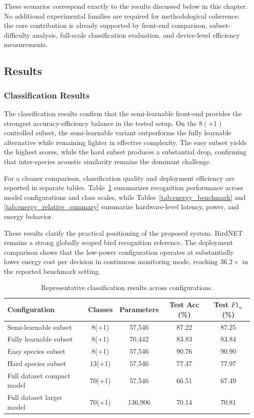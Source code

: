 \documentclass[a4paper,singleside,12pt]{report} %
\begin{document}
	These scenarios correspond exactly to the results discussed below in this chapter. No additional experimental families are required for methodological coherence: the core contribution is already supported by front-end comparison, subset-difficulty analysis, full-scale classification evaluation, and device-level efficiency measurements.

	\subsection{Results}
	\subsubsection{Classification Results}
	The classification results confirm that the semi-learnable front-end provides the strongest accuracy-efficiency balance in the tested setup. On the \(8(+1)\) controlled subset, the semi-learnable variant outperforms the fully learnable alternative while remaining lighter in effective complexity. The easy subset yields the highest scores, while the hard subset produces a substantial drop, confirming that inter-species acoustic similarity remains the dominant challenge.

	For a cleaner comparison, classification quality and deployment efficiency are reported in separate tables. Table~\ref{tab:extended_results} summarizes recognition performance across model configurations and class scales, while Tables~\ref{tab:energy_benchmark} and \ref{tab:energy_relative_summary} summarize hardware-level latency, power, and energy behavior.

		These results clarify the practical positioning of the proposed system. BirdNET remains a strong globally scoped bird recognition reference. The deployment comparison shows that the low-power configuration operates at substantially lower energy cost per decision in continuous monitoring mode, reaching \(36.2\times\) in the reported benchmark setting.

	\begin{table}[H]
		\centering
		\scriptsize
		\renewcommand{\arraystretch}{1.15}
		\setlength{\tabcolsep}{6pt}
		\caption{Representative classification results across configurations.}
		\label{tab:extended_results}
		\begin{tabular}{|l|c|c|c|c|}
			\hline
			Configuration & Classes & Parameters & Test Acc (\%) & Test \(F1_w\) (\%) \\
			\hline
			Semi-learnable subset & 8(+1) & 57,546 & 87.22 & 87.25 \\
			\hline
			Fully learnable subset & 8(+1) & 70,442 & 83.83 & 83.84 \\
			\hline
			Easy species subset & 8(+1) & 57,546 & 90.76 & 90.90 \\
			\hline
			Hard species subset & 13(+1) & 57,546 & 77.47 & 77.97 \\
			\hline
			Full dataset compact model & 70(+1) & 57,546 & 66.51 & 67.49 \\
			\hline
			Full dataset larger model & 70(+1) & 136,906 & 70.14 & 70.81 \\
			\hline
		\end{tabular}
	\end{table}
\end{document}
